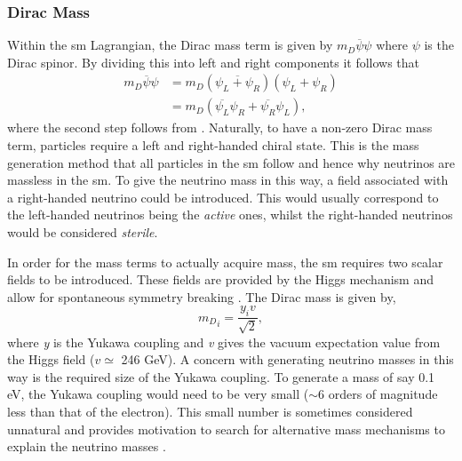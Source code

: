 \subsubsection{Dirac Mass}
Within the \gls{sm} Lagrangian, the Dirac mass term is given by $m_D\overline{\psi}\psi$ where $\psi$ is the Dirac spinor. By dividing this into left and right components it follows that
\begin{equation}\label{eqn:Dirac mass term}
\begin{split}
    m_D\overline{\psi}\psi &= m_D(\overline{\psi_L + \psi_R})(\psi_L + \psi_R) \\
    &= m_D(\overline{\psi_L}\psi_R + \overline{\psi_R}\psi_L),
\end{split}
\end{equation} 
where the second step follows from . Naturally, to have a non-zero Dirac mass term, particles require a left and right-handed chiral state. This is the mass generation method that all particles in the \gls{sm} follow and hence why neutrinos are massless in the \gls{sm}. To give the neutrino mass in this way, a field associated with a right-handed neutrino could be introduced. This would usually correspond to the left-handed neutrinos being the \textit{active} ones, whilst the right-handed neutrinos would be considered \textit{sterile}.

In order for the mass terms to actually acquire mass, the \gls{sm} requires two scalar fields to be introduced. These fields are provided by the Higgs mechanism and allow for spontaneous symmetry breaking \cite{peskin_and_schroeder}. The Dirac mass is given by, 
\begin{equation}
    {m_D}_i = \frac{y_iv}{\sqrt{2}},
\end{equation}
where \textit{y} is the Yukawa coupling and \textit{v} gives the vacuum expectation value from the Higgs field ($v \simeq$ 246 GeV). A concern with generating neutrino masses in this way is the required size of the Yukawa coupling. To generate a mass of say 0.1 eV, the Yukawa coupling would need to be very small ($\sim$6 orders of magnitude less than that of the electron). This small number is sometimes considered unnatural and provides motivation to search for alternative mass mechanisms to explain the neutrino masses \cite{Fundamentals_of_Neutrino_Physics_and_Astrophysics}.

